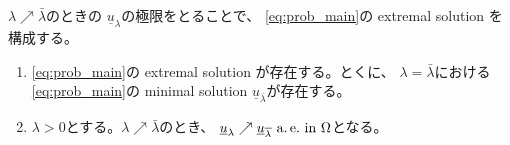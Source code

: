 $\lambda \nearrow \bar{\lambda}$のときの
$\underline{u}_\lambda$の極限をとることで、
\ref{eq:prob_main}の extremal solution を構成する。

\begin{prop} \label{prop:ext_exi}
 \begin{enumerate}[1.] \sage
  \item \ref{eq:prob_main}の extremal solution が存在する。とくに、
        $\lambda = \bar{\lambda}$における\ref{eq:prob_main}の
        minimal solution $\underline{u}_{\bar{\lambda}}$が存在する。
  \item $\lambda > 0$とする。$\lambda \nearrow \bar{\lambda}$のとき、
        $\underline{u}_\lambda \nearrow
        \underline{u}_{\overline{\lambda}} ~\text{a.\,e.}~
        \text{in}~
        \Omega$となる。
 \end{enumerate}
\end{prop}

